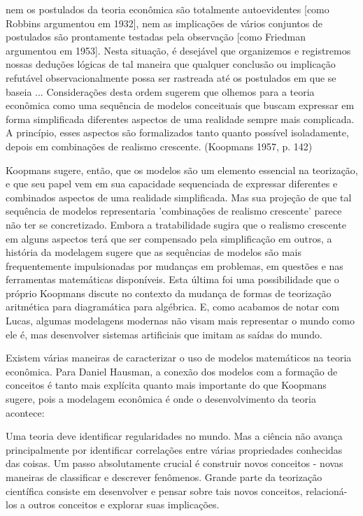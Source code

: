 \documentclass[a4paper,12pt]{article}[abntex2]
\begin{document}
nem os postulados da teoria econômica são totalmente autoevidentes [como Robbins argumentou em 1932], nem as implicações de vários conjuntos de postulados são prontamente testadas pela observação [como Friedman argumentou em 1953]. Nesta situação, é desejável que organizemos e registremos nossas deduções lógicas de tal maneira que qualquer conclusão ou implicação refutável observacionalmente possa ser rastreada até os postulados em que se baseia ... Considerações desta ordem sugerem que olhemos para a teoria econômica como uma sequência de modelos conceituais que buscam expressar em forma simplificada diferentes aspectos de uma realidade sempre mais complicada. A princípio, esses aspectos são formalizados tanto quanto possível isoladamente, depois em combinações de realismo crescente. (Koopmans 1957, p. 142)

Koopmans sugere, então, que os modelos são um elemento essencial na teorização, e que seu papel vem em sua capacidade sequenciada de expressar diferentes e combinados aspectos de uma realidade simplificada. Mas sua projeção de que tal sequência de modelos representaria 'combinações de realismo crescente' parece não ter se concretizado. Embora a tratabilidade sugira que o realismo crescente em alguns aspectos terá que ser compensado pela simplificação em outros, a história da modelagem sugere que as sequências de modelos são mais frequentemente impulsionadas por mudanças em problemas, em questões e nas ferramentas matemáticas disponíveis. Esta última foi uma possibilidade que o próprio Koopmans discute no contexto da mudança de formas de teorização aritmética para diagramática para algébrica. E, como acabamos de notar com Lucas, algumas modelagens modernas não visam mais representar o mundo como ele é, mas desenvolver sistemas artificiais que imitam as saídas do mundo.

Existem várias maneiras de caracterizar o uso de modelos matemáticos na teoria econômica. Para Daniel Hausman, a conexão dos modelos com a formação de conceitos é tanto mais explícita quanto mais importante do que Koopmans sugere, pois a modelagem econômica é onde o desenvolvimento da teoria acontece:

Uma teoria deve identificar regularidades no mundo. Mas a ciência não avança principalmente por identificar correlações entre várias propriedades conhecidas das coisas. Um passo absolutamente crucial é construir novos conceitos - novas maneiras de classificar e descrever fenômenos. Grande parte da teorização científica consiste em desenvolver e pensar sobre tais novos conceitos, relacioná-los a outros conceitos e explorar suas implicações.
\end{document}
